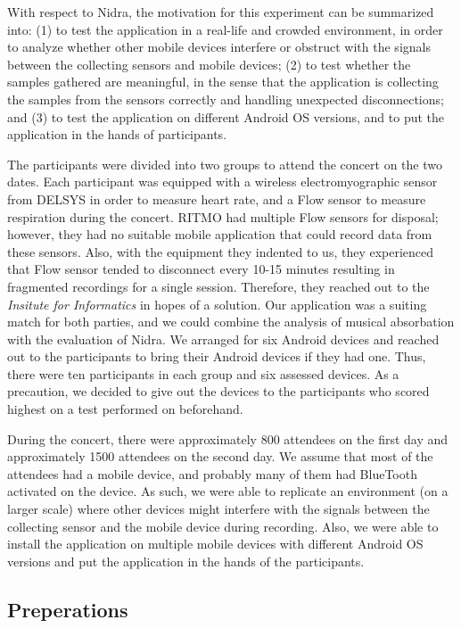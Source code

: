 With respect to Nidra, the motivation for this experiment can be summarized into: (1) to test the application in a real-life and crowded environment, in order to analyze whether other mobile devices interfere or obstruct with the signals between the collecting sensors and mobile devices; (2) to test whether the samples gathered are meaningful, in the sense that the application is collecting the samples from the sensors correctly and handling unexpected disconnections; and (3) to test the application on different Android OS versions, and to put the application in the hands of participants. 

The participants were divided into two groups to attend the concert on the two dates. Each participant was equipped with a wireless electromyographic sensor from DELSYS in order to measure heart rate, and a Flow sensor to measure respiration during the concert. RITMO had multiple Flow sensors for disposal; however, they had no suitable mobile application that could record data from these sensors. Also, with the equipment they indented to us, they experienced that Flow sensor tended to disconnect every 10-15 minutes resulting in fragmented recordings for a single session. Therefore, they reached out to the \textit{Insitute for Informatics} in hopes of a solution. Our application was a suiting match for both parties, and we could combine the analysis of musical absorbation with the evaluation of Nidra. We arranged for six Android devices and reached out to the participants to bring their Android devices if they had one. Thus, there were ten participants in each group and six assessed devices. As a precaution, we decided to give out the devices to the participants who scored highest on a test performed on beforehand.

During the concert, there were approximately 800 attendees on the first day and approximately 1500 attendees on the second day. We assume that most of the attendees had a mobile device, and probably many of them had BlueTooth activated on the device. As such, we were able to replicate an environment (on a larger scale) where other devices might interfere with the signals between the collecting sensor and the mobile device during recording. Also, we were able to install the application on multiple mobile devices with different Android OS versions and put the application in the hands of the participants. 

\subsection{Preperations}

